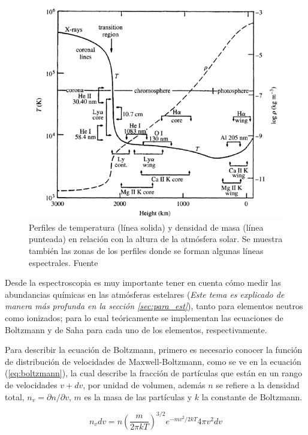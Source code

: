 \documentclass[12pt,oneside,openany,letter]{book}
\begin{document}
\begin{figure}[h]
    \centering
    \includegraphics[width=0.8\linewidth]{Images/perfil_Densidad-temperatura.png}
    \caption{Perfiles de temperatura (línea solida) y densidad de masa (línea punteada) en relación con la altura de la atmósfera solar. Se muestra también las zonas de los perfiles donde se forman algunas líneas espectrales. Fuente \citep{carroll2017introduction}}
    \label{perfil:densidad-temp}
\end{figure}


\noindent Desde la espectroscopia es muy importante tener en cuenta cómo medir las abundancias químicas en las atmósferas estelares (\textit{Este tema es explicado de manera más profunda en la sección \ref{sec:para_est}}), tanto para elementos neutros como ionizados; para lo cual teóricamente se implementan las ecuaciones de Boltzmann y de Saha para cada uno de los elementos, respectivamente.
\vspace{2mm}

\noindent Para describir la ecuación de Boltzmann, primero es necesario conocer la función de distribución de velocidades de Maxwell-Boltzmann, como se ve en la ecuación (\ref{eq:boltzmann}), la cual describe la fracción de partículas que están en un rango de velocidades $v + dv$, por unidad de volumen, además $n$ se refiere a la densidad total, $n_v = \partial n / \partial v$, $m$ es la masa de las partículas y $k$ la constante de Boltzmann.

\begin{equation}
n_{v} d v=n\left(\frac{m}{2 \pi k T}\right)^{3 / 2} e^{-m v^{2} / 2 k T} 4 \pi v^{2} d v
\label{eq:boltzmann}
\end{equation}
\end{document}
